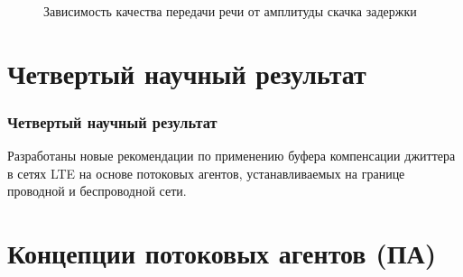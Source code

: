 \documentclass[10pt,pdf,hyperref={unicode}]{beamer}
\begin{document}
\begin{frame}
\begin{scriptsize}
\begin{figure} [!ht]
\caption*{Зависимость качества передачи речи от амплитуды скачка задержки}
  \label{img5:qos_amp}
\end{figure}

\end{scriptsize}
\end{frame}




\section{Четвертый научный результат}

\begin{frame}
\frametitle{Четвертый научный результат}

{\Large Разработаны новые рекомендации по применению буфера компенсации джиттера в сетях LTE на основе потоковых агентов, устанавливаемых на границе проводной и беспроводной сети.}

\end{frame}



\section{Концепции потоковых агентов (ПА)}
\end{document}
